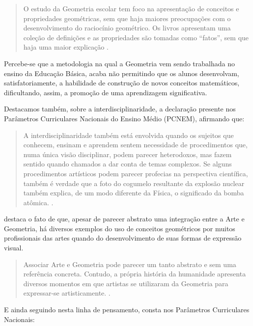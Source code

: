 \begin{refsection}
    \begin{quotation}
        O estudo da Geometria escolar tem foco na apresentação de conceitos e propriedades geométricas, sem que haja maiores preocupações com o desenvolvimento do raciocínio geométrico. Os livros apresentam uma coleção de definições e as propriedades são tomadas como “fatos”, sem que haja uma maior explicação \cite[p.~2]{CONTIEROAndGRAVINA2011Modelagem}.
    \end{quotation}

    Percebe-se que a metodologia na qual a Geometria vem sendo trabalhada no ensino da Educação Básica, acaba não permitindo que os alunos desenvolvam, satisfatoriamente, a habilidade de construção de novos conceitos matemáticos, dificultando, assim, a promoção de uma aprendizagem significativa.  

    Destacamos também, sobre a interdisciplinaridade, a declaração presente nos Parâmetros Curriculares Nacionais do Ensino Médio (PCNEM), afirmando que: 

    \begin{quotation}
        A interdisciplinaridade também está envolvida quando os sujeitos que conhecem, ensinam e aprendem sentem necessidade de procedimentos que, numa única visão disciplinar, podem parecer heterodoxos, mas fazem sentido quando chamados a dar conta de temas complexos. Se alguns procedimentos artísticos podem parecer profecias na perspectiva científica, também é verdade que a foto do cogumelo resultante da explosão nuclear também explica, de um modo diferente da Física, o significado da bomba atômica. \cite[p.~75]{ParâmetrosCurricularesMatematica2000}. 
    \end{quotation}

    \textcite{PEREIRA2016Arte} destaca o fato de que, apesar de parecer abstrato uma integração entre a Arte e Geometria, há diversos exemplos do uso de conceitos geométricos por muitos profissionais das artes quando do desenvolvimento de suas formas de expressão visual. 

    \begin{quotation}
        Associar Arte e Geometria pode parecer um tanto abstrato e sem uma referência concreta. Contudo, a própria história da humanidade apresenta diversos momentos em que artistas se utilizaram da Geometria para expressar-se artisticamente. \cite[p.~28]{PEREIRA2016Arte}. 
    \end{quotation}

    E ainda seguindo nesta linha de pensamento, consta nos Parâmetros Curriculares Nacionais:


\end{refsection}
